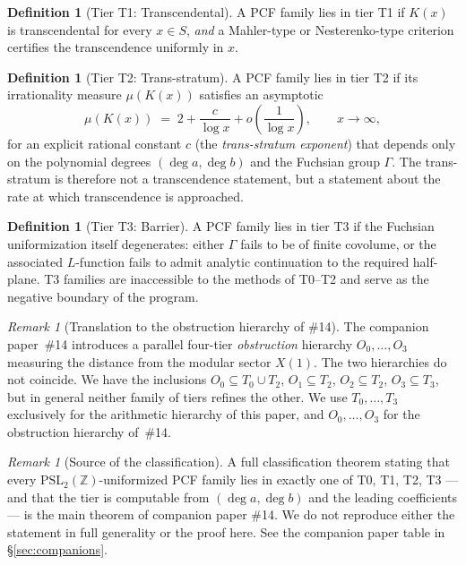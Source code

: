 \documentclass[11pt,a4paper]{article}
\theoremstyle{definition}
\newtheorem{definition}[conjecture]{Definition}
\theoremstyle{remark}
\newtheorem{remark}[conjecture]{Remark}
\newcommand{\PSLZ}{\mathrm{PSL}_2(\mathbb{Z})}
\begin{document}
\begin{definition}[Tier T1: Transcendental]
A PCF family lies in tier T1 if $K(x)$ is transcendental for every $x \in S$,
\emph{and} a Mahler-type or Nesterenko-type criterion certifies the
transcendence uniformly in $x$.
\end{definition}

\begin{definition}[Tier T2: Trans-stratum]
A PCF family lies in tier T2 if its irrationality measure $\mu(K(x))$
satisfies an asymptotic
\[
   \mu(K(x)) \;=\; 2 + \frac{c}{\log x} + o\!\left(\frac{1}{\log x}\right),
   \qquad x \to \infty,
\]
for an explicit rational constant $c$ (the \emph{trans-stratum exponent})
that depends only on the polynomial degrees $(\deg a, \deg b)$ and the
Fuchsian group $\Gamma$. The trans-stratum is therefore not a transcendence
statement, but a statement about the rate at which transcendence is
approached.
\end{definition}

\begin{definition}[Tier T3: Barrier]
A PCF family lies in tier T3 if the Fuchsian uniformization itself
degenerates: either $\Gamma$ fails to be of finite covolume, or the
associated $L$-function fails to admit analytic continuation to the
required half-plane. T3 families are inaccessible to the methods of T0--T2
and serve as the negative boundary of the program.
\end{definition}

\begin{remark}[Translation to the obstruction hierarchy of \#14]
\label{rem:tier-translation}
The companion paper~\#14 introduces a parallel four-tier
\emph{obstruction} hierarchy $O_0,\dots,O_3$ measuring the
distance from the modular sector $X(1)$. The two
hierarchies do not coincide. We have the inclusions
$O_0 \subseteq T_0 \cup T_2$, $O_1 \subseteq T_2$,
$O_2 \subseteq T_2$, $O_3 \subseteq T_3$, but in general
neither family of tiers refines the other. We use $T_0,\dots,T_3$
exclusively for the arithmetic hierarchy of this paper, and
$O_0,\dots,O_3$ for the obstruction hierarchy of~\#14.
\end{remark}

\begin{remark}[Source of the classification]
\label{rem:tiers-source}
A full classification theorem stating that every $\PSLZ$-uniformized
PCF family lies in exactly one of T0, T1, T2, T3 --- and that the
tier is computable from $(\deg a, \deg b)$ and the leading coefficients
--- is the main theorem of companion paper \#14. We do not reproduce
either the statement in full generality or the proof here. See the
companion paper table in \S\ref{sec:companions}.
\end{remark}
\end{document}
